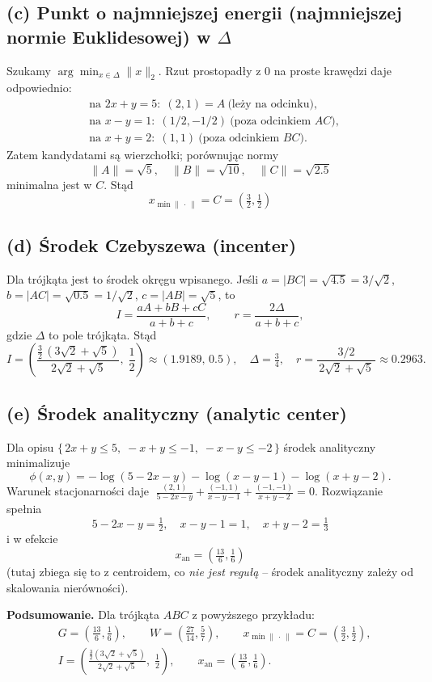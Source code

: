 \documentclass[12pt,a4paper]{article}
\begin{document}
\subsection*{(c) Punkt o najmniejszej energii (najmniejszej normie Euklidesowej) w \(\Delta\)}
Szukamy \(\displaystyle \arg\min_{x\in\Delta}\|x\|_2\).
Rzut prostopadły z \(0\) na proste krawędzi daje odpowiednio:
\[
\begin{aligned}
&\text{na } 2x+y=5:\; (2,1)=A\ \text{(leży na odcinku)},\\
&\text{na } x-y=1:\; (1/2,-1/2)\ \text{(poza odcinkiem \(AC\))},\\
&\text{na } x+y=2:\; (1,1)\ \text{(poza odcinkiem \(BC\))}.
\end{aligned}
\]
Zatem kandydatami są wierzchołki; porównując normy
\[
\|A\|=\sqrt{5},\quad \|B\|=\sqrt{10},\quad \|C\|=\sqrt{2.5}
\]
minimalna jest w \(C\). Stąd
\[
\boxed{\;x_{\min\|\,\cdot\,\|} = C=\left(\tfrac{3}{2},\tfrac{1}{2}\right)\;}
\]

\subsection*{(d) Środek Czebyszewa (incenter)}
Dla trójkąta jest to środek okręgu wpisanego. Jeśli \(a=|BC|=\sqrt{4.5}=3/\sqrt{2}\), \(b=|AC|=\sqrt{0.5}=1/\sqrt{2}\), \(c=|AB|=\sqrt{5}\),
to
\[
I=\frac{aA+bB+cC}{a+b+c},\qquad
r=\frac{2\Delta}{a+b+c},
\]
gdzie \(\Delta\) to pole trójkąta. Stąd
\[
I=\left(\frac{\tfrac{3}{2}\,(3\sqrt{2}+\sqrt{5})}{\,2\sqrt{2}+\sqrt{5}\,},\;\frac{1}{2}\right)\approx(1.9189,\,0.5),
\quad
\Delta=\tfrac{3}{4},\quad
r=\frac{3/2}{\,2\sqrt{2}+\sqrt{5}\,}\approx 0.2963.
\]

\subsection*{(e) Środek analityczny (analytic center)}
Dla opisu \(\{\,2x{+}y\le 5,\; -x{+}y\le -1,\; -x{-}y\le -2\,\}\) środek analityczny minimalizuje
\[
\phi(x,y)=-\log(5-2x-y)-\log(x-y-1)-\log(x+y-2).
\]
Warunek stacjonarności daje
\(\;\frac{(2,1)}{5-2x-y}+\frac{(-1,1)}{x-y-1}+\frac{(-1,-1)}{x+y-2}=0\).
Rozwiązanie spełnia
\[
5-2x-y=\tfrac{1}{2},\quad x-y-1=1,\quad x+y-2=\tfrac{1}{3}
\]
i w efekcie
\[
\boxed{\;x_{\mathrm{an}}=\left(\tfrac{13}{6},\tfrac{1}{6}\right)\;}
\]
(tutaj zbiega się to z centroidem, co \emph{nie jest regułą} – środek analityczny zależy od skalowania nierówności).

\bigskip
\noindent
\textbf{Podsumowanie.} Dla trójkąta \(ABC\) z powyższego przykładu:
\[
\begin{aligned}
&G=\left(\tfrac{13}{6},\tfrac{1}{6}\right),\qquad
W=\left(\tfrac{27}{14},\tfrac{5}{7}\right),\qquad
x_{\min\|\,\cdot\,\|}=C=\left(\tfrac{3}{2},\tfrac{1}{2}\right),\\[4pt]
&I=\left(\frac{\tfrac{3}{2}(3\sqrt{2}+\sqrt{5})}{2\sqrt{2}+\sqrt{5}},\;\tfrac12\right),\qquad
x_{\mathrm{an}}=\left(\tfrac{13}{6},\tfrac{1}{6}\right).
\end{aligned}
\]
\end{document}
